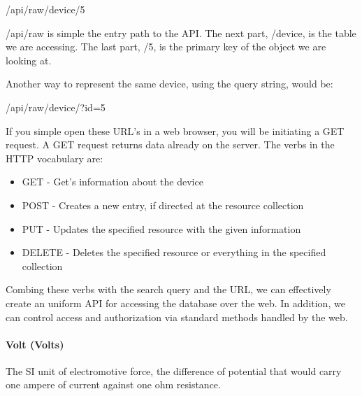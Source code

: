 /api/raw/device/5

/api/raw is simple the entry path to the API. 
The next part, /device, is the table we are accessing. 
The last part, /5, is the primary key of the object we are looking at.

Another way to represent the same device, using the query string, would be:

/api/raw/device/?id=5

If you simple open these URL's in a web browser, you will be initiating a GET request. A GET request returns data already on the server. The verbs in the HTTP vocabulary are:

\begin{itemize}
 \item GET - Get's information about the device
 \item POST - Creates a new entry, if directed at the resource collection
 \item PUT - Updates the specified resource with the given information
 \item DELETE - Deletes the specified resource or everything in the specified collection
\end{itemize}

Combing these verbs with the search query and the URL, we can effectively create an uniform API for accessing the database over the web.
In addition, we can control access and authorization via standard methods handled by the web.

\paragraph{Volt (Volts)}
The SI unit of electromotive force, the difference of potential that would carry one ampere of current against one ohm resistance.